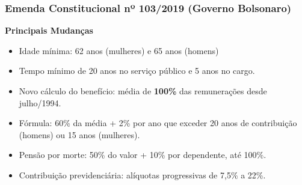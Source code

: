 \begin{frame}[c]\frametitle{Emenda Constitucional nº 103/2019 (Governo Bolsonaro)}
  \textbf{Principais Mudanças}
  \begin{itemize}
    \item Idade mínima: 62 anos (mulheres) e 65 anos (homens)
    \item Tempo mínimo de 20 anos no serviço público e 5 anos no cargo.
    \item Novo cálculo do benefício: média de \textbf{100\%} das remunerações desde julho/1994.
    \item Fórmula: 60\% da média + 2\% por ano que exceder 20 anos de contribuição (homens) ou 15 anos (mulheres).
    \item Pensão por morte: 50\% do valor + 10\% por dependente, até 100\%.
    \item Contribuição previdenciária: alíquotas progressivas de 7,5\% a 22\%.
  \end{itemize}
\end{frame}